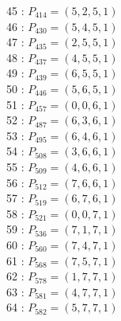 \documentclass{article}
\begin{document}
{\begin{multicols}{3}
45 : $P_{414}=( 5, 2, 5, 1 )$\\
46 : $P_{430}=( 5, 4, 5, 1 )$\\
47 : $P_{435}=( 2, 5, 5, 1 )$\\
48 : $P_{437}=( 4, 5, 5, 1 )$\\
49 : $P_{439}=( 6, 5, 5, 1 )$\\
50 : $P_{446}=( 5, 6, 5, 1 )$\\
51 : $P_{457}=( 0, 0, 6, 1 )$\\
52 : $P_{487}=( 6, 3, 6, 1 )$\\
53 : $P_{495}=( 6, 4, 6, 1 )$\\
54 : $P_{508}=( 3, 6, 6, 1 )$\\
55 : $P_{509}=( 4, 6, 6, 1 )$\\
56 : $P_{512}=( 7, 6, 6, 1 )$\\
57 : $P_{519}=( 6, 7, 6, 1 )$\\
58 : $P_{521}=( 0, 0, 7, 1 )$\\
59 : $P_{536}=( 7, 1, 7, 1 )$\\
60 : $P_{560}=( 7, 4, 7, 1 )$\\
61 : $P_{568}=( 7, 5, 7, 1 )$\\
62 : $P_{578}=( 1, 7, 7, 1 )$\\
63 : $P_{581}=( 4, 7, 7, 1 )$\\
64 : $P_{582}=( 5, 7, 7, 1 )$\\
\end{multicols}


%


%


}%
\end{document}
